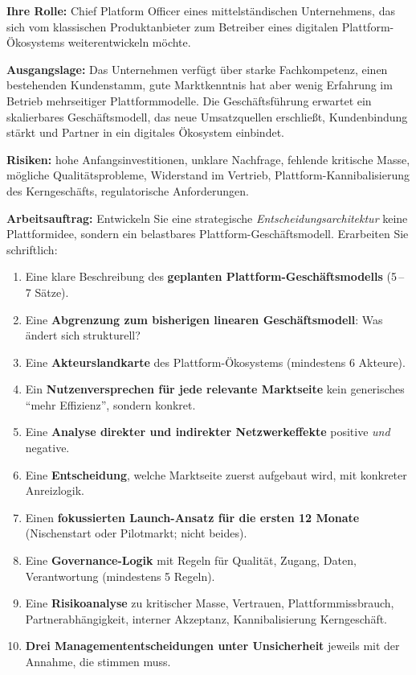 \documentclass[11pt,a4paper,oneside]{article}
\begin{document}
\begin{infobox}
\textbf{Ihre Rolle:} Chief Platform Officer eines mittelständischen Unternehmens, das sich vom klassischen Produktanbieter zum Betreiber eines digitalen Plattform-Ökosystems weiterentwickeln möchte.

\smallskip
\textbf{Ausgangslage:} Das Unternehmen verfügt über starke Fachkompetenz, einen bestehenden Kundenstamm, gute Marktkenntnis \textendash{} hat aber wenig Erfahrung im Betrieb mehrseitiger Plattformmodelle. Die Geschäftsführung erwartet ein skalierbares Geschäftsmodell, das neue Umsatzquellen erschließt, Kundenbindung stärkt und Partner in ein digitales Ökosystem einbindet.

\smallskip
\textbf{Risiken:} hohe Anfangsinvestitionen, unklare Nachfrage, fehlende kritische Masse, mögliche Qualitätsprobleme, Widerstand im Vertrieb, Plattform-Kannibalisierung des Kerngeschäfts, regulatorische Anforderungen.
\end{infobox}

\noindent\textbf{Arbeitsauftrag:} Entwickeln Sie eine strategische \emph{Entscheidungsarchitektur} \textendash{} keine Plattformidee, sondern ein belastbares Plattform-Geschäftsmodell. Erarbeiten Sie schriftlich:

\begin{enumerate}
  \item Eine klare Beschreibung des \textbf{geplanten Plattform-Geschäftsmodells} (5\,--\,7 Sätze).
  \item Eine \textbf{Abgrenzung zum bisherigen linearen Geschäftsmodell}: Was ändert sich strukturell?
  \item Eine \textbf{Akteurslandkarte} des Plattform-Ökosystems (mindestens 6 Akteure).
  \item Ein \textbf{Nutzenversprechen für jede relevante Marktseite} \textendash{} kein generisches ``mehr Effizienz'', sondern konkret.
  \item Eine \textbf{Analyse direkter und indirekter Netzwerkeffekte} \textendash{} positive \emph{und} negative.
  \item Eine \textbf{Entscheidung}, welche Marktseite zuerst aufgebaut wird, mit konkreter Anreizlogik.
  \item Einen \textbf{fokussierten Launch-Ansatz für die ersten 12 Monate} (Nischenstart oder Pilotmarkt; nicht beides).
  \item Eine \textbf{Governance-Logik} mit Regeln für Qualität, Zugang, Daten, Verantwortung (mindestens 5 Regeln).
  \item Eine \textbf{Risikoanalyse} zu kritischer Masse, Vertrauen, Plattformmissbrauch, Partnerabhängigkeit, interner Akzeptanz, Kannibalisierung Kerngeschäft.
  \item \textbf{Drei Managemententscheidungen unter Unsicherheit} \textendash{} jeweils mit der Annahme, die stimmen muss.
\end{enumerate}
\end{document}
